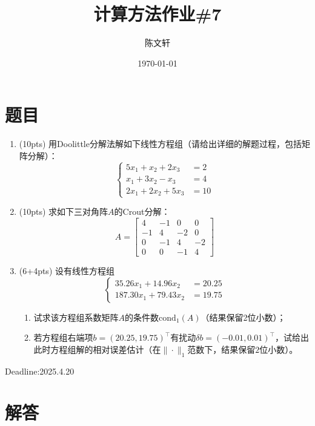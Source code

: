 \documentclass[cn,hazy,green,11pt,normal]{elegantnote}
\title{计算方法作业\#7}
\author{陈文轩}
\institute{KFRC}
\date{\today}
\begin{document}
\maketitle

\section{题目}


    \begin{enumerate}
        \item (10pts) 用Doolittle分解法解如下线性方程组（请给出详细的解题过程，包括矩阵分解）：
            \[\begin{cases}5x_1+x_2+2x_3&=2\\x_1+3x_2-x_3&=4\\2x_1+2x_2+5x_3&=10\end{cases}\]
        \item (10pts) 求如下三对角阵$A$的Crout分解：
            \[A=\begin{bmatrix}4&-1&0&0\\-1&4&-2&0\\0&-1&4&-2\\0&0&-1&4\end{bmatrix}\]
        \item (6+4pts) 设有线性方程组
            \[\begin{cases}35.26x_1+14.96x_2&=20.25\\187.30x_1+79.43x_2&=19.75\end{cases}\]
            \begin{enumerate}
                \item 试求该方程组系数矩阵$A$的条件数$\mathrm{cond}_1(A)$（结果保留2位小数）；
                \item 若方程组右端项$b=(20.25,19.75)^{\top}$有扰动$\delta b=(-0.01,0.01)^{\top}$，试给出此时方程组解的相对误差估计（在$\|\cdot\|_1$范数下，结果保留$2$位小数）。
            \end{enumerate}
    \end{enumerate}

    Deadline:2025.4.20

\section{解答}
\end{document}

